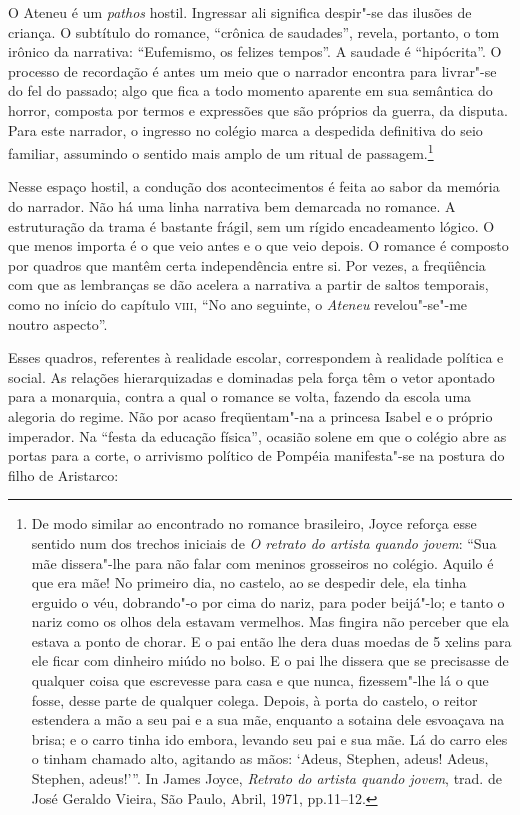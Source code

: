 O Ateneu é um \textit{pathos}
hostil. Ingressar ali significa despir"-se das ilusões de criança. O
subtítulo do romance, ``crônica de saudades'', revela, portanto, o tom
irônico da narrativa: ``Eufemismo, os felizes tempos''. A saudade é
``hipócrita''. O processo de recordação é antes um meio que o narrador
encontra para livrar"-se do fel do passado; algo que fica a todo
momento aparente em sua semântica do horror, composta por termos e
expressões que são próprios da guerra, da disputa. Para este narrador,
o ingresso no colégio marca a despedida definitiva do seio familiar,
assumindo o sentido mais amplo de um ritual de passagem.\footnote{ De
modo similar ao encontrado no romance brasileiro, Joyce reforça esse
sentido num dos trechos iniciais de \textit{O retrato do artista quando
jovem}: ``Sua mãe dissera"-lhe para não falar com meninos grosseiros no
colégio. Aquilo é que era mãe! No primeiro dia, no castelo, ao se
despedir dele, ela tinha erguido o véu, dobrando"-o por cima do nariz,
para poder beijá"-lo; e tanto o nariz como os olhos dela estavam
vermelhos. Mas fingira não perceber que ela estava a ponto de chorar. E
o pai então lhe dera duas moedas de 5 xelins para ele ficar com
dinheiro miúdo no bolso. E o pai lhe dissera que se precisasse de
qualquer coisa que escrevesse para casa e que nunca, fizessem"-lhe lá
o que fosse, desse parte de qualquer colega. Depois, à porta do
castelo, o reitor estendera a mão a seu pai e a sua mãe, enquanto a
sotaina dele esvoaçava na brisa; e o carro tinha ido embora, levando
seu pai e sua mãe. Lá do carro eles o tinham chamado alto, agitando as
mãos: `Adeus, Stephen, adeus! Adeus, Stephen, adeus!'''. In James
Joyce, \textit{Retrato do artista quando jovem}, trad. de José Geraldo
Vieira, São Paulo, Abril, 1971, pp.11--12.}

Nesse espaço hostil, a condução dos acontecimentos é
feita ao sabor da memória do narrador. Não há uma linha narrativa bem
demarcada no romance. A estruturação da trama é bastante frágil, sem um
rígido encadeamento lógico. 
O que menos importa é o que veio antes e o que veio depois. O romance é composto
por quadros que mantêm certa independência entre si. Por vezes,
a freqüência com que as lembranças se dão acelera a narrativa a partir
de saltos temporais, como no início do capítulo \textsc{viii}, ``No ano seguinte,
o \textit{Ateneu} revelou"-se"-me noutro aspecto''.

Esses quadros, referentes à realidade escolar, correspondem à realidade
política e social. As relações hierarquizadas e dominadas pela força
têm o vetor apontado para a monarquia, contra a qual o romance se
volta, fazendo da escola uma alegoria do regime. Não por acaso
freqüentam"-na a princesa Isabel e o próprio imperador. Na ``festa da
educação física'', ocasião solene em que o colégio abre as portas para a
corte, o arrivismo político de Pompéia manifesta"-se na postura do
filho de Aristarco:

